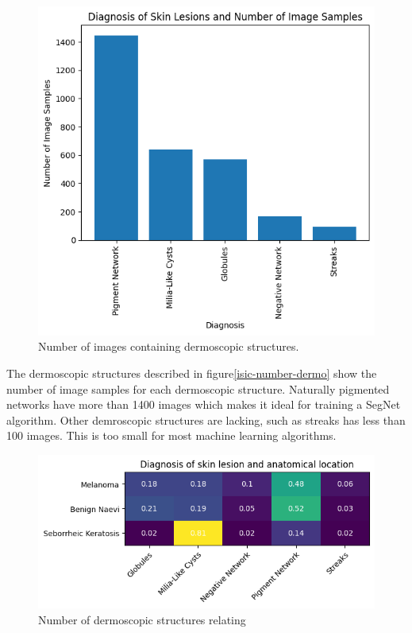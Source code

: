 \begin{figure}
    \centering
    \includegraphics[scale=0.75]{images/ISIC/isic-dermo-number.png}
    \caption{Number of images containing dermoscopic structures.} 
\end{figure}\label{isic-number-dermo}

The dermoscopic structures described in figure\ref{isic-number-dermo} show the number of image samples for each dermoscopic structure. Naturally pigmented networks have more than 1400 images which makes it ideal for training a SegNet algorithm. Other demroscopic structures are lacking, such as streaks has less than 100 images. This is too small for most machine learning algorithms.

\begin{figure}
    \centering
    \includegraphics[scale=0.75]{images/ISIC/isic-dermo-diagnosis-heat.png}
    \caption{Number of dermoscopic structures relating} 
\end{figure}\label{isic-dermo-diagnosis}

